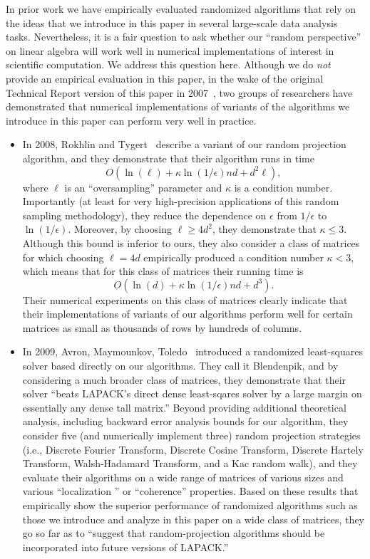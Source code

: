 \documentclass[11pt]{article}
\begin{document}
In prior work we have empirically evaluated randomized algorithms that rely on
the ideas that we introduce in this paper in several large-scale data
analysis tasks. Nevertheless, it is a fair question to ask whether our ``random
perspective'' on linear algebra will work well in numerical
implementations of interest in scientific computation.
We address this question here.
Although we do \emph{not} provide an empirical evaluation in this paper,
in the wake of the original Technical Report version of this paper in
2007~\cite{DMMS07_FastL2_TR}, two groups of researchers have
demonstrated that numerical implementations of variants of the
algorithms we introduce in this paper can perform very well in practice.
\begin{itemize}
\item
In 2008, Rokhlin and Tygert~\cite{RT08} describe a variant of our random
projection algorithm, and they demonstrate that their algorithm runs in
time
$$
O(\ln(\ell) + \kappa\ln(1/\epsilon)nd+d^2\ell) ,
$$
where $\ell$ is an ``oversampling'' parameter and $\kappa$ is a condition
number.
Importantly (at least for very high-precision applications of this random
sampling methodology), they reduce the dependence on $\epsilon$ from
$1/\epsilon$ to $\ln(1/\epsilon)$.
Moreover, by choosing $\ell \ge 4d^2$, they demonstrate that $\kappa \le 3$.
Although this bound is inferior to ours, they also consider a class of
matrices for which choosing $\ell=4d$ empirically produced a condition
number $\kappa <3$, which means that for this class of matrices their
running time is
$$
O(\ln(d) + \kappa\ln(1/\epsilon)nd+d^3) .
$$
Their numerical experiments on this class of matrices clearly indicate that
their implementations of variants of our algorithms
perform well for certain matrices as small as thousands of rows by hundreds
of columns.
\item
In 2009, Avron, Maymounkov, Toledo~\cite{AMT09_DRAFT,AMT10}
introduced a randomized least-squares solver based directly on our
algorithms.
They call it Blendenpik, and by considering a much broader class of
matrices, they demonstrate that their solver ``beats \textsc{LAPACK}'s
direct dense least-sqares solver by a large margin on essentially any
dense tall matrix.''
Beyond providing additional theoretical analysis, including backward error
analysis bounds for our algorithm,
they consider five (and numerically implement three) random projection
strategies (i.e., Discrete Fourier Transform, Discrete Cosine
Transform, Discrete Hartely Transform, Walsh-Hadamard Transform, and a Kac
random walk), and they evaluate their algorithms on a wide range of matrices
of various sizes and various ``localization '' or ``coherence'' properties.
Based on these results that empirically show the superior performance of
randomized algorithms such as those we introduce and analyze in this paper
on a wide class of matrices, they go so far as to ``suggest that
random-projection algorithms should be incorporated into future versions of
\textsc{LAPACK}.''
\end{itemize}
\end{document}
